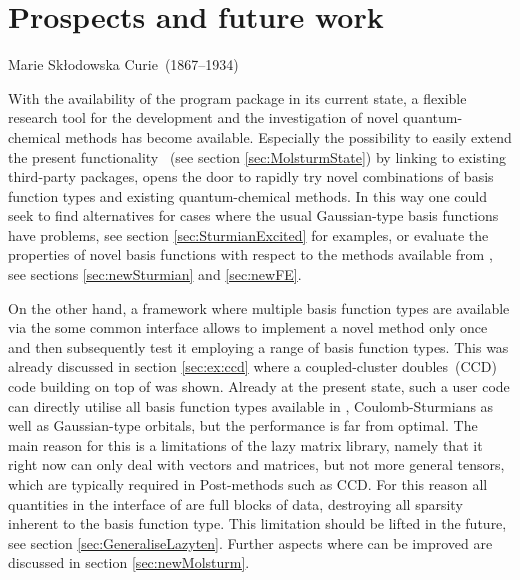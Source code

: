 \chapter{Prospects and future work}
\label{ch:Prospects}
{Marie Skłodowska Curie~(1867--1934)}

\noindent
With the availability of the \molsturm program package in its
current state, a flexible research tool
for the development and the investigation of novel quantum-chemical methods
has become available.
Especially the possibility to easily extend the present functionality%
~(see section \vref{sec:MolsturmState})
by linking to existing third-party packages,
opens the door to rapidly try novel combinations of basis function types
and existing quantum-chemical methods.
In this way one could seek to find alternatives
for cases where the usual Gaussian-type basis functions have problems,
see section \ref{sec:SturmianExcited} for examples,
or evaluate the properties of novel basis functions
with respect to the methods available from \molsturm,
see sections \ref{sec:newSturmian} and \ref{sec:newFE}.

On the other hand, a framework where multiple basis function types
are available via the some common interface allows to
implement a novel method only once and then subsequently
test it employing a range of basis function types.
This was already discussed in section \vref{sec:ex:ccd}
where a coupled-cluster doubles~(CCD) code building on top of \molsturm was shown.
Already at the present state, such a user code can
directly utilise all basis function types available in \molsturm,
\ie Coulomb-Sturmians as well as Gaussian-type orbitals,
but the performance is far from optimal.
The main reason for this is a limitations of the \lazyten lazy matrix library,
namely that it right now can only deal with vectors and matrices,
but not more general tensors,
which are typically required in Post-\HF methods such as CCD.
For this reason all quantities in the \python interface
of \molsturm are full blocks of data,
destroying all sparsity inherent to the basis function type.
This limitation should be lifted in the future,
see section \ref{sec:GeneraliseLazyten}.
Further aspects where \molsturm can be improved are discussed
in section \ref{sec:newMolsturm}.

